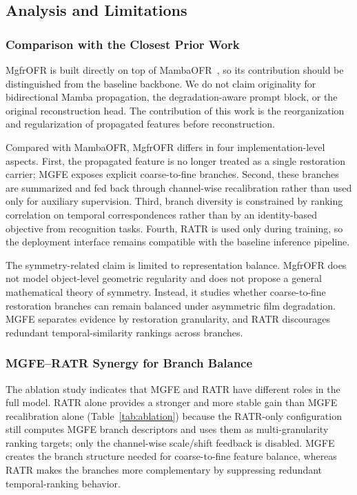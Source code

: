\documentclass[symmetry,article,submit,pdftex,moreauthors]{Definitions/mdpi}
\begin{document}
\FloatBarrier
\subsection{Analysis and Limitations}
\label{subsec:analysis_limitations}

\subsubsection{Comparison with the Closest Prior Work}
\label{subsec:vs_mambaofr}

MgfrOFR is built directly on top of MambaOFR~\cite{mao2025mambaofr}, so its contribution should be distinguished from the baseline backbone. We do not claim originality for bidirectional Mamba propagation, the degradation-aware prompt block, or the original reconstruction head. The contribution of this work is the reorganization and regularization of propagated features before reconstruction.

Compared with MambaOFR, MgfrOFR differs in four implementation-level aspects. First, the propagated feature is no longer treated as a single restoration carrier; MGFE exposes explicit coarse-to-fine branches. Second, these branches are summarized and fed back through channel-wise recalibration rather than used only for auxiliary supervision. Third, branch diversity is constrained by ranking correlation on temporal correspondences rather than by an identity-based objective from recognition tasks. Fourth, RATR is used only during training, so the deployment interface remains compatible with the baseline inference pipeline.

The symmetry-related claim is limited to representation balance. MgfrOFR does not model object-level geometric regularity and does not propose a general mathematical theory of symmetry. Instead, it studies whether coarse-to-fine restoration branches can remain balanced under asymmetric film degradation. MGFE separates evidence by restoration granularity, and RATR discourages redundant temporal-similarity rankings across branches.

\subsubsection{MGFE--RATR Synergy for Branch Balance}
\label{subsec:synergy}

The ablation study indicates that MGFE and RATR have different roles in the full model. RATR alone provides a stronger and more stable gain than MGFE recalibration alone (Table~\ref{tab:ablation}) because the RATR-only configuration still computes MGFE branch descriptors and uses them as multi-granularity ranking targets; only the channel-wise scale/shift feedback is disabled. MGFE creates the branch structure needed for coarse-to-fine feature balance, whereas RATR makes the branches more complementary by suppressing redundant temporal-ranking behavior.
\end{document}
